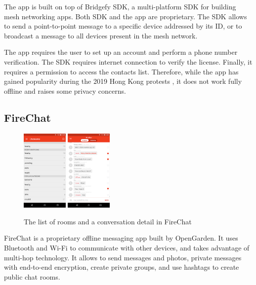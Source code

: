 \documentclass[conference,compsoc]{IEEEtran}
\begin{document}
The app is built on top of Bridgefy SDK, a multi-platform SDK for building mesh networking apps. Both SDK and the app are proprietary. The SDK allows to send a point-to-point message to a specific device addressed by its ID, or to broadcast a message to all devices present in the mesh network.

The app requires the user to set up an account and perform a phone number verification. The SDK requires internet connection to verify the license. Finally, it requires a permission to access the contacts list. Therefore, while the app has gained popularity during the 2019 Hong Kong protests \cite{forbes:hk}, it does not work fully offline and raises some privacy concerns.

\subsection{FireChat}

\begin{figure}[h]
  \centering
  \includegraphics[width=0.2\textwidth]{firechat1}
  \includegraphics[width=0.2\textwidth]{firechat2}
  \caption{The list of rooms and a conversation detail in FireChat \cite{firechat}}
\end{figure}

FireChat \cite{firechat} is a proprietary offline messaging app built by OpenGarden. It uses Bluetooth and Wi-Fi to communicate with other devices, and takes advantage of multi-hop technology. It allows to send messages and photos, private messages with end-to-end encryption, create private groups, and use hashtags to create public chat rooms.
\end{document}
